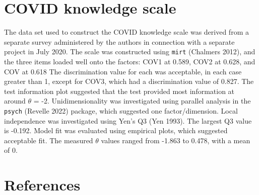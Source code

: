 \documentclass[11pt,halfline,a4paper,]{ouparticle}
\begin{document}
\hypertarget{covid-knowledge-scale}{%
\section{COVID knowledge scale}\label{covid-knowledge-scale}}

The data set used to construct the COVID knowledge scale was derived
from a separate survey administered by the authors in connection with a
separate project in July 2020. The scale was constructed using
\texttt{mirt} (Chalmers 2012), and the three items loaded well onto the
factors: COV1 at 0.589, COV2 at 0.628, and COV at 0.618 The
discrimination value for each was acceptable, in each case greater than
1, except for COV3, which had a discrimination value of 0.827. The test
information plot suggested that the test provided most information at
around \(\theta\) = -2. Unidimensionality was investigated using
parallel analysis in the \texttt{psych} (Revelle 2022) package, which
suggested one factor/dimension. Local independence was investigated
using Yen's Q3 (Yen 1993). The largest Q3 value is -0.192. Model fit was
evaluated using empirical plots, which suggested acceptable fit. The
measured \(\theta\) values ranged from -1.863 to 0.478, with a mean of
0.

\hypertarget{references}{%
\section*{References}\label{references}}
\end{document}
